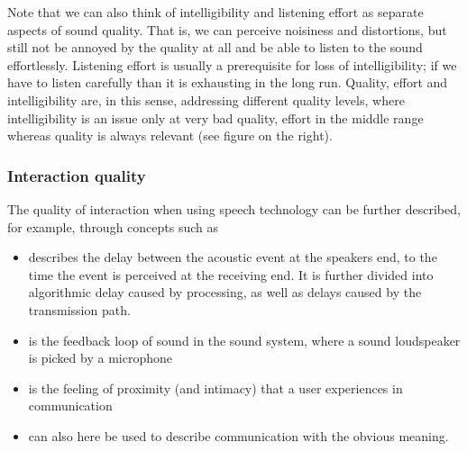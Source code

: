 \documentclass[letterpaper,10pt,english]{jupyterBook}
\begin{document}
\sphinxAtStartPar
Note that we can also think of intelligibility and listening effort as
separate aspects of sound quality. That is, we can perceive noisiness
and distortions, but still not be annoyed by the quality at all and be
able to listen to the sound effortlessly. Listening effort is usually a
prerequisite for loss of intelligibility; if we have to listen carefully
than it is exhausting in the long run. Quality, effort and
intelligibility are, in this sense, addressing different quality levels,
where intelligibility is an issue only at very bad quality, effort in
the middle range whereas quality is always relevant (see figure on the
right).


\subsubsection{Interaction quality}
\label{\detokenize{Evaluation/Subjective_quality_evaluation:interaction-quality}}
\sphinxAtStartPar
The quality of interaction when using speech technology can be further
described, for example, through concepts such as
\begin{itemize}
\item {} 
\sphinxAtStartPar
{} describes the delay between the acoustic event at the
speakers end, to the time the event is perceived at the receiving
end. It is further divided into algorithmic delay caused by
processing, as well as delays caused by the transmission path.

\item {} 
\sphinxAtStartPar
{} is the feedback loop of sound in the sound system, where a
sound loudspeaker is picked by a microphone

\item {} 
\sphinxAtStartPar
{} is the feeling of proximity (and intimacy)
that a user experiences in communication

\item {} 
\sphinxAtStartPar
{} can also here be used to describe communication with
the obvious meaning.

\end{itemize}

\sphinxAtStartPar
{}
\end{document}
